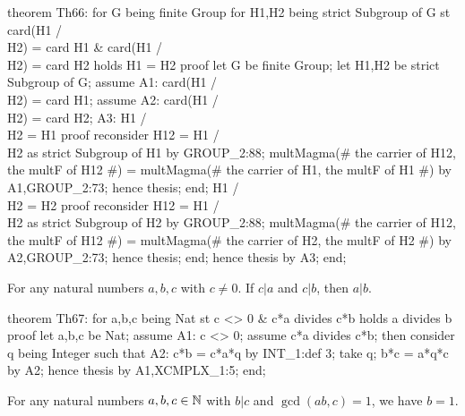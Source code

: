 \nwenddocs{}\endmoddef\nwstartdeflinemarkup{}\nwenddeflinemarkup
theorem Th66:
  for G being finite Group
  for H1,H2 being strict Subgroup of G
  st card(H1 /\\ H2) = card H1 & card(H1 /\\ H2) = card H2
  holds H1 = H2
proof
  let G be finite Group;
  let H1,H2 be strict Subgroup of G;
  assume A1: card(H1 /\\ H2) = card H1;
  assume A2: card(H1 /\\ H2) = card H2;
  A3: H1 /\\ H2 = H1
  proof
    reconsider H12 = H1 /\\ H2 as strict Subgroup of H1 by GROUP_2:88;
    multMagma(# the carrier of H12, the multF of H12 #)
    = multMagma(# the carrier of H1, the multF of H1 #) by A1,GROUP_2:73;
    hence thesis;
  end;
  H1 /\\ H2 = H2
  proof
    reconsider H12 = H1 /\\ H2 as strict Subgroup of H2 by GROUP_2:88;
    multMagma(# the carrier of H12, the multF of H12 #)
    = multMagma(# the carrier of H2, the multF of H2 #) by A2,GROUP_2:73;
    hence thesis;
  end;
  hence thesis by A3;
end;
\eatline
{}\nwendcode{}\nwdocspar
\begin{theorem}
For any natural numbers $a,b,c$ with $c\neq0$. If $c|a$ and $c|b$, then $a|b$.
\end{theorem}

\nwenddocs{}\endmoddef\nwstartdeflinemarkup{}\nwenddeflinemarkup
theorem Th67:
  for a,b,c being Nat
  st c <> 0 & c*a divides c*b
  holds a divides b
proof
  let a,b,c be Nat;
  assume A1: c <> 0;
  assume c*a divides c*b;
  then consider q being Integer such that
  A2: c*b = c*a*q by INT_1:def 3;
  take q;
  b*c = a*q*c by A2;
  hence thesis by A1,XCMPLX_1:5;
end;
\eatline
{}\nwendcode{}\nwdocspar
\begin{theorem}
For any natural numbers $a,b,c\in\mathbb{N}$ with $b|c$ and $\gcd(ab,c)=1$, we
have $b=1$.
\end{theorem}

